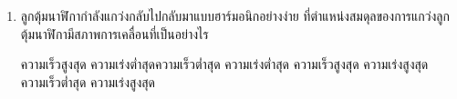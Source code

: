 \begin{enumerate}
	\item \runningj \nonet ลูกตุ้มนาฬิกากำลังแกว่งกลับไปกลับมาแบบฮาร์มอนิกอย่างง่าย   ที่ตำแหน่งสมดุลของการแกว่งลูกตุ้มนาฬิกามีสภาพการเคลื่อนที่เป็นอย่างไร
	\begin{2c}
		{ความเร็วสูงสุด  ความเร่งต่ำสุด}{ความเร็วต่ำสุด  ความเร่งต่ำสุด}
		{ความเร็วสูงสุด  ความเร่งสูงสุด}{ความเร็วต่ำสุด  ความเร่งสูงสุด}
	\end{2c}
\end{enumerate}
